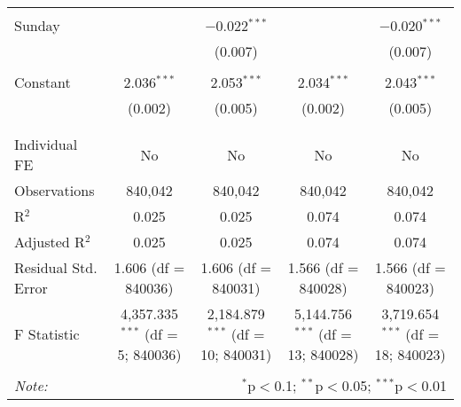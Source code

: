 \documentclass[
]{article}
\begin{document}
\begin{table}[!htbp]
{\begin{tabular}{@{\extracolsep{5pt}}lcccc}
  & & & & \\ 
 Sunday &  & $-$0.022$^{***}$ &  & $-$0.020$^{***}$ \\ 
  &  & (0.007) &  & (0.007) \\ 
  & & & & \\ 
 Constant & 2.036$^{***}$ & 2.053$^{***}$ & 2.034$^{***}$ & 2.043$^{***}$ \\ 
  & (0.002) & (0.005) & (0.002) & (0.005) \\ 
  & & & & \\ 
\hline \\[-1.8ex] 
Individual FE & No & No & No & No \\ 
Observations & 840,042 & 840,042 & 840,042 & 840,042 \\ 
R$^{2}$ & 0.025 & 0.025 & 0.074 & 0.074 \\ 
Adjusted R$^{2}$ & 0.025 & 0.025 & 0.074 & 0.074 \\ 
Residual Std. Error & 1.606 (df = 840036) & 1.606 (df = 840031) & 1.566 (df = 840028) & 1.566 (df = 840023) \\ 
F Statistic & 4,357.335$^{***}$ (df = 5; 840036) & 2,184.879$^{***}$ (df = 10; 840031) & 5,144.756$^{***}$ (df = 13; 840028) & 3,719.654$^{***}$ (df = 18; 840023) \\ 
\hline 
\hline \\[-1.8ex] 
\textit{Note:}  & \multicolumn{4}{r}{$^{*}$p$<$0.1; $^{**}$p$<$0.05; $^{***}$p$<$0.01} \\ 
\end{tabular}
} 
\end{table} 
\newpage
\end{document}

